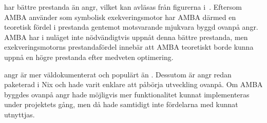 \stoe{} har bättre prestanda än angr, vilket kan avläsas från figurerna
i~\cite[Figur~1-5]{systematic_comparison_symbex}. Eftersom AMBA använder \stoe{}
som symbolisk exekveringsmotor har AMBA därmed en teoretisk fördel i prestanda
gentemot motsvarande mjukvara byggd ovanpå angr. AMBA har i nuläget inte
nödvändigtvis uppnåt denna bättre prestanda, men exekveringsmotorns
prestandafördel innebär att AMBA teoretiskt borde kunna uppnå en högre prestanda
efter medveten optimering.

angr är mer väldokumenterat och populärt än \stoe{}. Dessutom är angr redan
paketerad i Nix och hade varit enklare att påbörja utveckling ovanpå. Om AMBA
byggdes ovanpå angr hade möjligvis mer funktionalitet kunnat implementeras under
projektets gång, men då hade samtidigt inte fördelarna med \stoe{} kunnat
utnyttjas.
